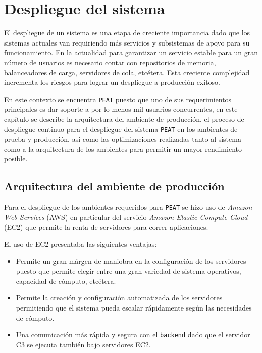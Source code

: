 \chapter{Despliegue del sistema}

El despliegue de un sistema es una etapa de creciente importancia dado que los
sistemas actuales van requiriendo más servicios y subsistemas de apoyo para
su funcionamiento. En la actualidad para garantizar un servicio estable para
un gran número de usuarios es necesario contar con repositorios de memoria,
balanceadores de carga, servidores de cola, etcétera. Esta creciente complejidad
incrementa los riesgos para lograr un despliegue a producción exitoso.

En este contexto se encuentra \texttt{PEAT} puesto que uno de sus requerimientos
principales es dar soporte a por lo menos mil usuarios concurrentes, en este
capítulo se describe la arquitectura del ambiente de producción, el proceso
de despliegue continuo para el despliegue del sistema \texttt{PEAT} en los
ambientes de prueba y producción, así como las optimizaciones realizadas
tanto al sistema como a la arquitectura de los ambientes para permitir un mayor
rendimiento posible.

\section{Arquitectura del ambiente de producción}
\label{sec:production}

Para el despliegue de los ambientes requeridos para \texttt{PEAT} se hizo uso de
\textit{Amazon Web Services} (AWS) en particular del servicio
\textit{Amazon Elastic Compute Cloud} (EC2) que permite la renta de servidores
para correr aplicaciones.

El uso de EC2 presentaba las siguientes ventajas:
\begin{itemize}
\item Permite un gran márgen de maniobra en la configuración de los servidores
  puesto que permite elegir entre una gran variedad de sistema operativos,
  capacidad de cómputo, etcétera.
\item Permite la creación y configuración automatizada de los servidores
  permitiendo que el sistema pueda escalar rápidamente según las necesidades
  de cómputo.
\item Una comunicación más rápida y segura con el \texttt{backend} dado que el
  servidor C3 se ejecuta también bajo servidores EC2.
\end{itemize}

